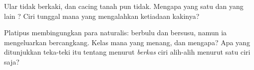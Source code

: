 \begin{exercise}[$\star\star$]\label{exo:g4:classifying-animals:10}
Ular tidak berkaki, dan cacing tanah pun tidak. Mengapa yang satu
  dan yang lain ? Ciri tunggal mana yang
mengalahkan ketiadaan kakinya?
\end{exercise}

\begin{exercise}[$\star\star\star$]\label{exo:g4:classifying-animals:11}
Platipus membingungkan para naturalis: berbulu dan bersusu, namun ia
mengeluarkan  bercangkang. Kelas mana yang menang, dan mengapa?
Apa yang ditunjukkan teka-teki itu tentang  menurut
\emph{berkas} ciri alih-alih menurut satu ciri saja?
\end{exercise}
